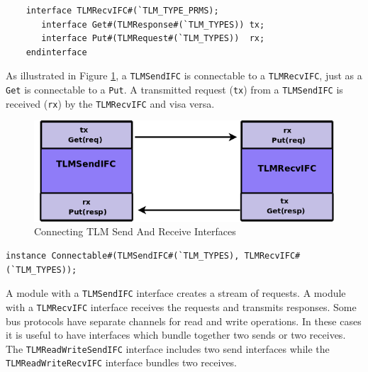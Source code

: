 \documentclass[twoside,letterpaper]{article}
\newcommand{\te}[1]{\texttt{#1}}
\begin{document}
\begin{verbatim}
    interface TLMRecvIFC#(`TLM_TYPE_PRMS);
       interface Get#(TLMResponse#(`TLM_TYPES)) tx;
       interface Put#(TLMRequest#(`TLM_TYPES))  rx;
    endinterface
\end{verbatim}


As illustrated in Figure \ref{TLMconnect}, a \te{TLMSendIFC} is
connectable to a \te{TLMRecvIFC}, just as a \te{Get} is connectable to
a \te{Put}.  A transmitted request (\te{tx})
from a \te{TLMSendIFC} is received (\te{rx}) by the \te{TLMRecvIFC}
and visa versa.

\begin{figure}[ht]
\begin{center}
\includegraphics[height = 1.2 in]{TLMinterfaces}
\caption{Connecting TLM Send And Receive Interfaces}
\label{TLMconnect}
\end{center}
\end{figure}


\begin{verbatim}
instance Connectable#(TLMSendIFC#(`TLM_TYPES), TLMRecvIFC#(`TLM_TYPES));
\end{verbatim}


A module with a \te{TLMSendIFC} interface creates a stream of
requests. A module with a \te{TLMRecvIFC} interface receives the
requests and transmits responses. Some bus protocols have separate
channels for read and write operations. In these cases it is useful to
have interfaces which bundle together two sends or two receives.  The
\te{TLMReadWriteSendIFC} interface includes two send interfaces while
the \te{TLMReadWriteRecvIFC} interface bundles two receives.
\end{document}
